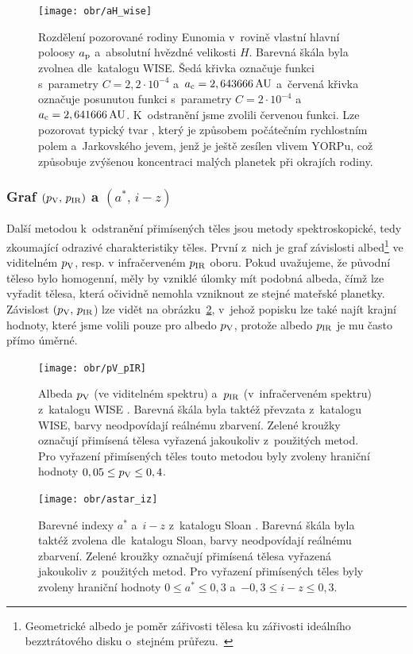 \documentclass[A4paper, 12pt, oneside]{book}
\begin{document}
\begin{figure}
	\centering
	\texttt{[image: obr/aH\_wise]}
	\caption{Rozdělení pozorované rodiny Eunomia v~rovině vlastní hlavní poloosy $a_{\rm p}$ a~absolutní hvězdné velikosti $H$. Barevná škála byla zvolnea dle~katalogu WISE. Šedá křivka označuje funkci s~parametry ${C=2,2\cdot10^{-4}}$ a~${a_{\rm c}=2,643666\,{\rm AU}}$ a~červená křivka označuje posunutou funkci s~parametry ${C=2\cdot10^{-4}}$ a~${a_{\rm c}=2,641666\,{\rm AU}}$. K~odstranění  jsme zvolili červenou funkci. Lze pozorovat typický tvar , který je způsobem počátečním rychlostním polem a~Jarkovského jevem, jenž je ještě zesílen vlivem YORPu, což způsobuje zvýšenou koncentraci malých planetek při okrajích rodiny.}
	\label{fig:aH_wise}
\end{figure}

\subsubsection{Graf $(p_{\rm V},\,p_{\rm IR})$ a $(a^*,\,i-z)$}
Další metodou k~odstranění přimísených těles jsou metody spektroskopické, tedy zkoumající odrazivé charakteristiky těles. První z~nich je graf závislosti albed\footnote{Geometrické albedo je poměr zářivosti tělesa ku zářivosti ideálního bezztrátového disku o~stejném průřezu.~\cite{fmt}} ve viditelném $p_{\rm V}$, resp. v infračerveném $p_{\rm IR}$ oboru. Pokud uvažujeme, že původní těleso bylo homogenní, měly by vzniklé úlomky mít podobná albeda, čímž lze vyřadit tělesa, která očividně nemohla vzniknout ze stejné mateřské planetky. Závislost $(p_{\rm V},\,p_{\rm IR}$) lze vidět na obrázku~\ref{fig:pV_pIR}, v~jehož popisku lze také najít krajní hodnoty, které jsme volili pouze pro albedo $p_{\rm V}$, protože albedo $p_{\rm IR}$ je mu často přímo úměrné.

\begin{figure}
	\centering
	\texttt{[image: obr/pV\_pIR]}
	\caption{Albeda $p_{\rm V}$ (ve viditelném spektru) a~$p_{\rm IR}$ (v~infračerveném spektru) z~katalogu WISE \cite{nugent15}. Barevná škála byla taktéž převzata z~katalogu WISE, barvy neodpovídají reálnému zbarvení. Zelené kroužky označují přimísená tělesa vyřazená jakoukoliv z~použitých metod. Pro vyřazení přimísených těles touto metodou byly zvoleny hraniční hodnoty $0,05 \leq p_{\rm V} \leq 0,4$.}
	\label{fig:pV_pIR}
\end{figure}

\begin{figure}
	\centering
	\texttt{[image: obr/astar\_iz]}
	\caption{Barevné indexy $a^*$ a~$i-z$ z~katalogu Sloan \cite{ivezic01}. Barevná škála byla taktéž zvolena dle~katalogu Sloan, barvy neodpovídají reálnému zbarvení. Zelené kroužky označují přimísená tělesa vyřazená jakoukoliv z~použitých metod. Pro vyřazení přimísených těles byly zvoleny hraniční hodnoty $0\leq a^* \leq 0,3$ a~$-0,3\leq i-z \leq 0,3$.}
	\label{fig:astar_iz}
\end{figure}
\end{document}
